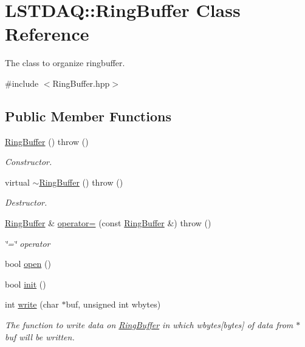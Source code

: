 \hypertarget{class_l_s_t_d_a_q_1_1_ring_buffer}{}\section{L\+S\+T\+D\+A\+Q\+:\+:Ring\+Buffer Class Reference}
\label{class_l_s_t_d_a_q_1_1_ring_buffer}


The class to organize ringbuffer.  




{\ttfamily \#include $<$Ring\+Buffer.\+hpp$>$}

\subsection*{Public Member Functions}
\begin{DoxyCompactItemize}
\item 
\hyperlink{class_l_s_t_d_a_q_1_1_ring_buffer_a73c8c103abb16180f8287045a1a3c991}{Ring\+Buffer} ()  throw ()
\begin{DoxyCompactList}\small\item\em Constructor. \end{DoxyCompactList}\item 
virtual \hyperlink{class_l_s_t_d_a_q_1_1_ring_buffer_a93d7015f6225d9e37fddff92aef0a8b9}{$\sim$\+Ring\+Buffer} ()  throw ()
\begin{DoxyCompactList}\small\item\em Destructor. \end{DoxyCompactList}\item 
\hyperlink{class_l_s_t_d_a_q_1_1_ring_buffer}{Ring\+Buffer} \& \hyperlink{class_l_s_t_d_a_q_1_1_ring_buffer_a018ba5a5649552fe28a226486becf9c8}{operator=} (const \hyperlink{class_l_s_t_d_a_q_1_1_ring_buffer}{Ring\+Buffer} \&)  throw ()
\begin{DoxyCompactList}\small\item\em \char`\"{}=\char`\"{} operator \end{DoxyCompactList}\item 
bool \hyperlink{class_l_s_t_d_a_q_1_1_ring_buffer_aa74541deb15ec24ed7cf50f22b3d8376}{open} ()
\item 
bool \hyperlink{class_l_s_t_d_a_q_1_1_ring_buffer_a1c6cee9d706927ec698eca7ee06586b2}{init} ()
\item 
int \hyperlink{class_l_s_t_d_a_q_1_1_ring_buffer_a6e5dd48d737d2a7cdc8e53baa97900eb}{write} (char $\ast$buf, unsigned int wbytes)
\begin{DoxyCompactList}\small\item\em The function to write data on \hyperlink{class_l_s_t_d_a_q_1_1_ring_buffer}{Ring\+Buffer} in which wbytes\mbox{[}bytes\mbox{]} of data from $\ast$buf will be written. \end{DoxyCompactList}\item 

\end{DoxyCompactItemize}

